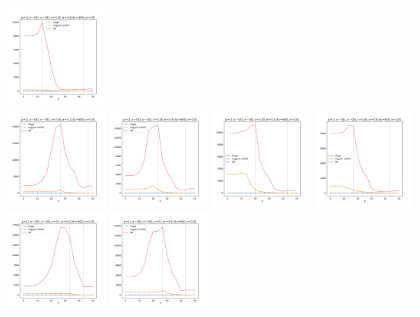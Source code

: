 \documentclass[a4paper]{article}
\begin{document}
\begin{figure}[H]
  \includegraphics[width=0.23\textwidth]{grid-g4-v2-w4_0}
  \\
  \includegraphics[width=0.23\textwidth]{grid-g4-v3-w1_0}
  \includegraphics[width=0.23\textwidth]{grid-g4-v3-w2_0}
  \includegraphics[width=0.23\textwidth]{grid-g4-v3-w3_0}
  \includegraphics[width=0.23\textwidth]{grid-g4-v3-w4_0}
  \\
  \includegraphics[width=0.23\textwidth]{grid-g4-v4-w1_0}
  \includegraphics[width=0.23\textwidth]{grid-g4-v4-w2_0}

\end{figure}
\end{document}
